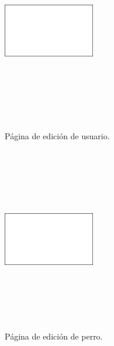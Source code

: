 \documentclass[a4paper, 12pt]{article}
\begin{document}
\begin{figure}[H]
   	\begin{minipage}{0.48\textwidth}
		\begin{center}
			{\includegraphics[height=8cm, width=4cm]{White.png}\par}
			\caption{Página de edición de usuario.}
			\medskip
		\end{center}  
	\end{minipage}\hfill
   	\begin{minipage}{0.48\textwidth}
		\begin{center}
			{\includegraphics[height=8cm, width=4cm]{White.png}\par}
			\caption{Página de edición de perro.}
			\medskip
		\end{center}  
	\end{minipage}\hfill
\end{figure}
\end{document}
